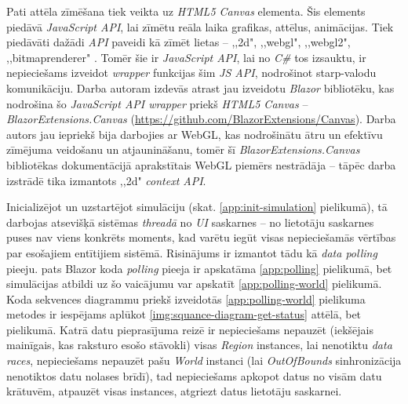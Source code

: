 Pati attēla zīmēšana tiek veikta uz \emph{HTML5 Canvas} elementa\cite{html5:canvas}.
Šis elements piedāvā \emph{JavaScript API}, lai zīmētu reāla laika grafikas, attēlus, animācijas.
Tiek piedāvāti dažādi \emph{API} paveidi kā zīmēt lietas -- ,,2d", ,,webgl", ,,webgl2",
,,bitmaprenderer" \cite{html5:canvas-contexts}. Tomēr šie ir \emph{JavaScript API}, lai
no \emph{C\#} tos izsauktu, ir nepieciešams izveidot \emph{wrapper} funkcijas šim \emph{JS API},
nodrošinot starp-valodu komunikāciju. Darba autoram izdevās atrast jau izveidotu \emph{Blazor} bibliotēku,
kas nodrošina šo \emph{JavaScript API wrapper} priekš  \emph{HTML5 Canvas} -- \emph{BlazorExtensions.Canvas}
(\url{https://github.com/BlazorExtensions/Canvas}).
Darba autors jau iepriekš bija darbojies ar WebGL, kas nodrošinātu ātru un efektīvu
zīmējuma veidošanu un atjaunināšanu, tomēr šī \emph{BlazorExtensions.Canvas} bibliotēkas
dokumentācijā aprakstītais WebGL piemērs nestrādāja -- tāpēc darba izstrādē tika
izmantots ,,2d" \emph{context API}.

Inicializējot un uzstartējot simulāciju (skat. \ref{app:init-simulation} pielikumā), tā darbojas atsevišķā
sistēmas \emph{threadā} no \emph{UI} saskarnes -- no lietotāju saskarnes puses nav
viens konkrēts moments, kad
varētu iegūt visas nepieciešamās vērtības par esošajiem entītijiem sistēmā. Risinājums
ir izmantot tādu kā \emph{data polling}\cite{progr:data-polling} pieeju. pats Blazor koda \emph{polling}
pieeja ir apskatāma \ref{app:polling} pielikumā, bet simulācijas atbildi uz šo
vaicājumu var apskatīt \ref{app:polling-world} pielikumā. Koda sekvences
diagrammu priekš izveidotās \ref{app:polling-world} pielikuma metodes ir iespējams
aplūkot \ref{img:squance-diagram-get-status}
attēlā, bet pielikumā. Katrā
datu pieprasījuma reizē ir nepieciešams nepauzēt (iekšējais mainīgais, kas raksturo esošo stāvokli) visas \emph{Region} instances,
lai nenotiktu \emph{data races}, nepieciešams nepauzēt pašu \emph{World} instanci (lai
\emph{OutOfBounds} sinhronizācija nenotiktos datu nolases brīdī), tad nepieciešams apkopot
datus no visām datu krātuvēm, atpauzēt visas instances, atgriezt datus lietotāju saskarnei.

